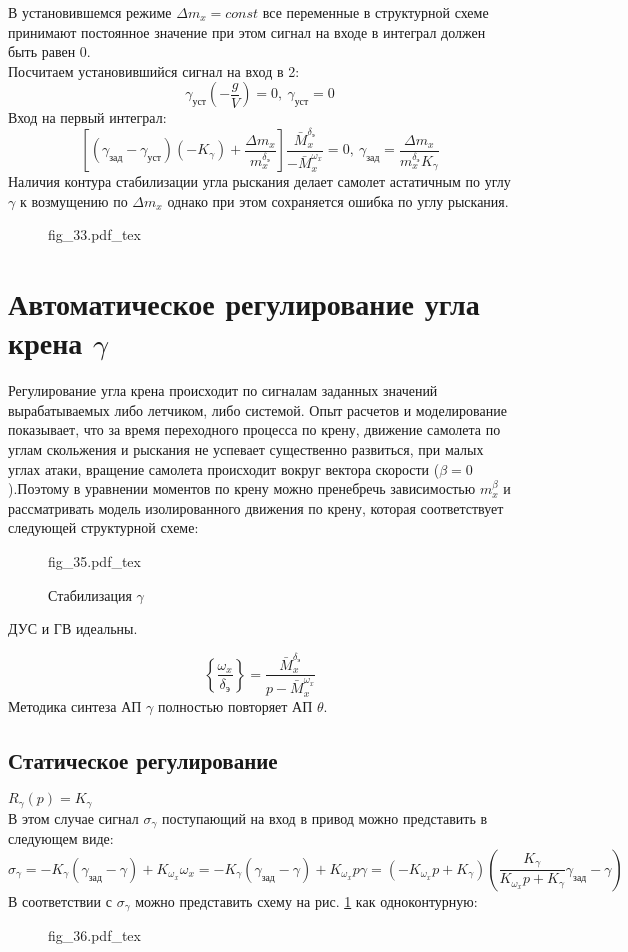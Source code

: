 \documentclass{article}
\begin{document}
В установившемся режиме $\Delta m_x = const$ все переменные в структурной схеме принимают постоянное значение при этом сигнал на входе в интеграл должен быть равен 0.\\
Посчитаем установившийся сигнал на вход в 2:
\[
	\gamma_\text{уст}(-\frac{g}{V}) = 0,\ \gamma_\text{уст} = 0 
\]
Вход на первый интеграл:
\[
	\left[(\gamma_\text{зад} - \gamma_\text{уст})(-K_\gamma)+\frac{\Delta m_x}{m_x^{\delta_\text{э}}}\right]\frac{\bar{M}_x^{\delta_\text{э}}}{-\bar{M}_x^{\omega_x}}= 0,\ \gamma_\text{зад}=\frac{\Delta m_x}{m_x^{\delta_\text{э}}K_{\gamma}} 
\]
Наличия контура стабилизации угла рыскания делает самолет астатичным по углу $\gamma$ к возмущению по $\Delta m_x$ однако при этом сохраняется ошибка по углу рыскания.

\begin{figure}[H]
	\centering
	{fig_33.pdf_tex}
\end{figure}

\section{Автоматическое регулирование угла крена $\gamma$}
Регулирование угла крена происходит по сигналам заданных значений вырабатываемых либо летчиком, либо системой. Опыт расчетов и моделирование показывает, что за время переходного процесса по крену, движение самолета по углам скольжения и рыскания не успевает существенно развиться, при малых углах атаки, вращение самолета происходит вокруг вектора скорости ($\beta = 0$).Поэтому в уравнении моментов по крену можно пренебречь зависимостью $m_x^\beta$ и рассматривать модель изолированного движения по крену, которая соответствует следующей структурной схеме:

\begin{figure}[H]
	\centering
	{fig_35.pdf_tex}
	\caption{Стабилизация $\gamma$}
	\label{fig:stab_gamma}
\end{figure}
ДУС и ГВ идеальны.

\[
	\left\{\frac{\omega_x}{\delta_\text{э}} \right\} =\frac{\bar{M}_x^{\delta_\text{э}}}{ p - \bar{M}_x^{\omega_x}} 
\]
Методика синтеза АП $\gamma$ полностью повторяет АП $\theta$.

\subsection{Статическое регулирование}
$R_\gamma(p) = K_\gamma$\\
В этом случае сигнал $\sigma_\gamma$ поступающий на вход в привод можно представить в следующем виде: 
\[
	\sigma_\gamma =  - K_\gamma(\gamma_\text{зад} - \gamma) + K_{\omega_x} \omega_x = - K_{\gamma} (\gamma_\text{зад} - \gamma) + K_{\omega_x} p \gamma = (-K_{\omega_x} p + K_\gamma) \left(\frac{K_\gamma}{K_{\omega_x}p + K_\gamma} \gamma_\text{зад} - \gamma \right)
\]
В соответствии с $\sigma_\gamma$ можно представить схему на рис. \ref{fig:stab_gamma} как одноконтурную:\\
\begin{figure}[H]
	\centering
	{fig_36.pdf_tex}
\end{figure}
\end{document}

